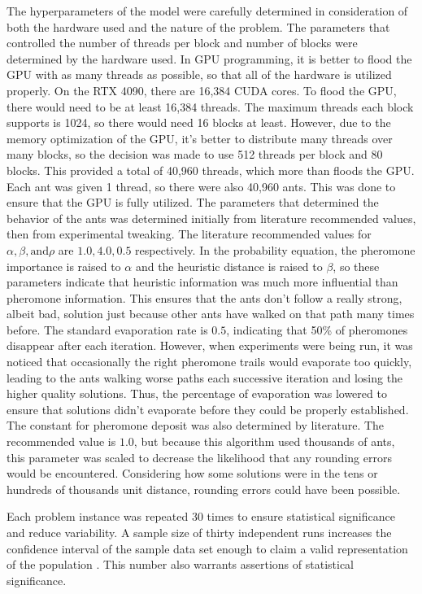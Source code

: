 \documentclass[11pt]{report}
\begin{document}
     The hyperparameters of the model were carefully determined in consideration of both the hardware used and the nature of the problem. The parameters that controlled the number of threads per block and number of blocks were determined by the hardware used. In GPU programming, it is better to flood the GPU with as many threads as possible, so that all of the hardware is utilized properly. On the RTX 4090, there are 16,384 CUDA cores. To flood the GPU, there would need to be at least 16,384 threads. The maximum threads each block supports is 1024, so there would need 16 blocks at least. However, due to the memory optimization of the GPU, it's better to distribute many threads over many blocks, so the decision was made to use 512 threads per block and 80 blocks. This provided a total of 40,960 threads, which more than floods the GPU. Each ant was given 1 thread, so there were also 40,960 ants. This was done to ensure that the GPU is fully utilized. The parameters that determined the behavior of the ants was determined initially from literature recommended values, then from experimental tweaking. The literature recommended values for $\alpha, \beta, \text{and} \rho$ are $1.0, 4.0, 0.5$ respectively. In the probability equation, the pheromone importance is raised to $\alpha$ and the heuristic distance is raised to $\beta$, so these parameters indicate that heuristic information was much more influential than pheromone information. This ensures that the ants don't follow a really strong, albeit bad, solution just because other ants have walked on that path many times before. The standard evaporation rate is $0.5$, indicating that 50\% of pheromones disappear after each iteration. However, when experiments were being run, it was noticed that occasionally the right pheromone trails would evaporate too quickly, leading to the ants walking worse paths each successive iteration and losing the higher quality solutions. Thus, the percentage of evaporation was lowered to ensure that solutions didn't evaporate before they could be properly established. The constant for pheromone deposit was also determined by literature. The recommended value is $1.0$, but because this algorithm used thousands of ants, this parameter was scaled to decrease the likelihood that any rounding errors would be encountered. Considering how some solutions were in the tens or hundreds of thousands unit distance, rounding errors could have been possible. 
     
     Each problem instance was repeated 30 times to ensure statistical significance and reduce variability. A sample size of thirty independent runs increases the confidence interval of the sample data set enough to claim a valid representation of the population \cite{clt2008}. This number also warrants assertions of statistical significance.
    
\end{document}
